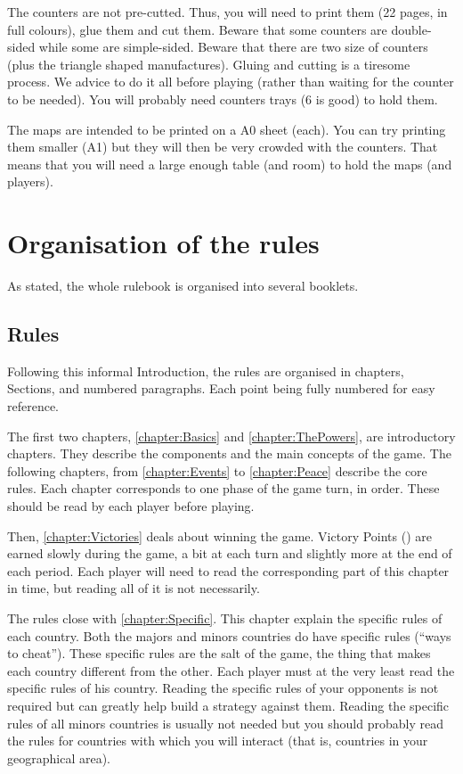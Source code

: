 The counters are not pre-cutted. Thus, you will need to print them (22 pages,
in full colours), glue them and cut them. Beware that some counters are
double-sided while some are simple-sided. Beware that there are two size of
counters (plus the triangle shaped manufactures). Gluing and cutting is a
tiresome process. We advice to do it all before playing (rather than waiting
for the counter to be needed). You will probably need counters trays (6 is
good) to hold them.

The maps are intended to be printed on a A0 sheet (each). You can try printing
them smaller (A1) but they will then be very crowded with the counters. That
means that you will need a large enough table (and room) to hold the maps (and
players).

\section*{Organisation of the rules}
As stated, the whole rulebook is organised into several booklets.
\subsection*{Rules}

Following this informal Introduction, the rules are organised in chapters,
Sections, and numbered paragraphs. Each point being fully numbered for easy
reference.

The first two chapters, \ref{chapter:Basics} and \ref{chapter:ThePowers}, are
introductory chapters. They describe the components and the main concepts of
the game. The following chapters, from \ref{chapter:Events} to
\ref{chapter:Peace} describe the core rules. Each chapter corresponds to one
phase of the game turn, in order. These should be read by each player before
playing.

Then, \ref{chapter:Victories} deals about winning the game. Victory Points
(\VPs) are earned slowly during the game, a bit at each turn and slightly more
at the end of each period. Each player will need to read the corresponding
part of this chapter in time, but reading all of it is not necessarily.

The rules close with \ref{chapter:Specific}. This chapter explain the specific
rules of each country. Both the majors and minors countries do have specific
rules (``ways to cheat''). These specific rules are the salt of the game, the
thing that makes each country different from the other. Each player must at
the very least read the specific rules of his country. Reading the specific
rules of your opponents is not required but can greatly help build a strategy
against them. Reading the specific rules of all minors countries is usually
not needed but you should probably read the rules for countries with which you
will interact (that is, countries in your geographical area).

